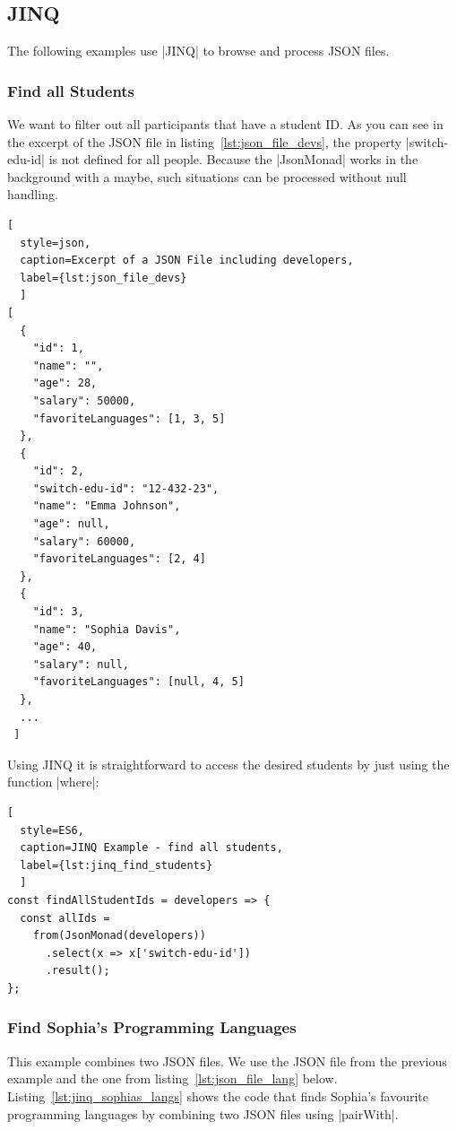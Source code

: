 \subsection{JINQ}
\label{sub:results JINQ}
The following examples use |JINQ| to browse and process JSON files.

\subsubsection{Find all Students}
\label{subsub:Find all Students}
We want to filter out all participants that have a student ID. As you can see
in the excerpt of the JSON file in listing~\ref{lst:json_file_devs}, the
property |switch-edu-id| is not defined for all people. Because the
|JsonMonad| works in the background with a maybe, such situations can be
processed without null handling.

\begin{lstlisting}[
  style=json, 
  caption=Excerpt of a JSON File including developers,
  label={lst:json_file_devs}
  ]
[
  {
    "id": 1,
    "name": "",
    "age": 28,
    "salary": 50000,
    "favoriteLanguages": [1, 3, 5]
  },
  {
    "id": 2,
    "switch-edu-id": "12-432-23",
    "name": "Emma Johnson",
    "age": null,
    "salary": 60000,
    "favoriteLanguages": [2, 4]
  },
  {
    "id": 3,
    "name": "Sophia Davis",
    "age": 40,
    "salary": null,
    "favoriteLanguages": [null, 4, 5]
  },
  ...
 ]
\end{lstlisting}

Using JINQ it is straightforward to access the desired students by just using
the function |where|:

\begin{lstlisting}[
  style=ES6, 
  caption=JINQ Example - find all students,
  label={lst:jinq_find_students}
  ]
const findAllStudentIds = developers => {
  const allIds =
    from(JsonMonad(developers))
      .select(x => x['switch-edu-id'])
      .result();
};
\end{lstlisting}

\subsubsection{Find Sophia's Programming Languages}
\label{subsub:Find Sophia's Programming Languages}

This example combines two JSON files. We use the JSON file from the previous
example and the one from listing~\ref{lst:json_file_lang} below.
Listing~\ref{lst:jinq_sophias_langs} shows the code that finds Sophia's 
favourite programming languages by combining two JSON files using |pairWith|. 

